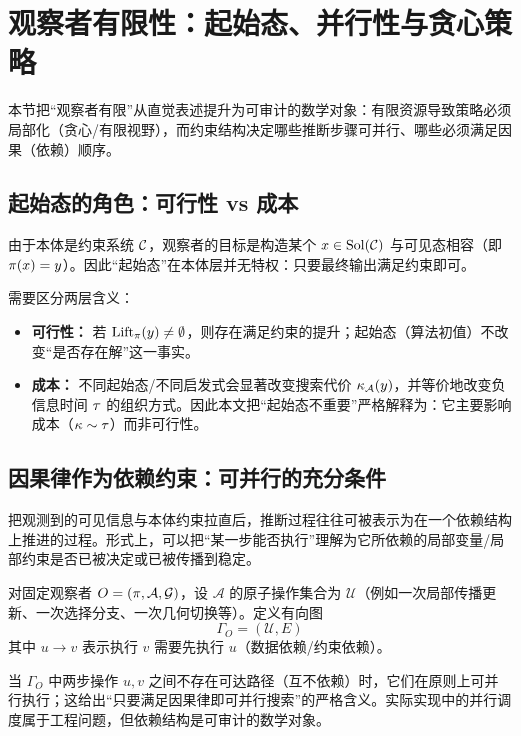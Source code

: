 \section{观察者有限性：起始态、并行性与贪心策略}

本节把“观察者有限”从直觉表述提升为可审计的数学对象：有限资源导致策略必须局部化（贪心/有限视野），而约束结构决定哪些推断步骤可并行、哪些必须满足因果（依赖）顺序。

\subsection{起始态的角色：可行性 vs 成本}

由于本体是约束系统 \(\mathcal{C}\)，观察者的目标是构造某个 \(x\in\mathrm{Sol}(\mathcal{C})\) 与可见态相容（即 \(\pi(x)=y\)）。因此“起始态”在本体层并无特权：只要最终输出满足约束即可。

\begin{remark}
需要区分两层含义：
\begin{itemize}
  \item \textbf{可行性：} 若 \(\mathrm{Lift}_{\pi}(y)\neq\emptyset\)，则存在满足约束的提升；起始态（算法初值）不改变“是否存在解”这一事实。
  \item \textbf{成本：} 不同起始态/不同启发式会显著改变搜索代价 \(\kappa_{\mathcal A}(y)\)，并等价地改变负信息时间 \(\tau\) 的组织方式。因此本文把“起始态不重要”严格解释为：它主要影响成本（\(\kappa\sim\tau\)）而非可行性。
\end{itemize}
\end{remark}

\subsection{因果律作为依赖约束：可并行的充分条件}

把观测到的可见信息与本体约束拉直后，推断过程往往可被表示为在一个依赖结构上推进的过程。形式上，可以把“某一步能否执行”理解为它所依赖的局部变量/局部约束是否已被决定或已被传播到稳定。

\begin{definition}
对固定观察者 \(O=(\pi,\mathcal A,\mathcal G)\)，设 \(\mathcal A\) 的原子操作集合为 \(\mathcal U\)（例如一次局部传播更新、一次选择分支、一次几何切换等）。定义有向图
\[
\Gamma_O=(\mathcal U, E)
\]
其中 \(u\to v\) 表示执行 \(v\) 需要先执行 \(u\)（数据依赖/约束依赖）。
\end{definition}

\begin{remark}[并行性与因果律]
当 \(\Gamma_O\) 中两步操作 \(u,v\) 之间不存在可达路径（互不依赖）时，它们在原则上可并行执行；这给出“只要满足因果律即可并行搜索”的严格含义。实际实现中的并行调度属于工程问题，但依赖结构是可审计的数学对象。
\end{remark}

